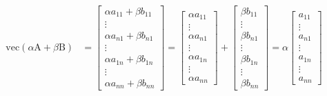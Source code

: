 \documentclass[11pt,a4paper]{article}
\begin{document}
\begin{align*}
\mathrm{vec}(\alpha \mathrm{A} + \beta \mathrm{B})
&=
\begin{bmatrix}
 		\alpha a_{11}+ \beta b_{11}  \\
 		\vdots \\
 		\alpha a_{n1}+ \beta b_{n1} \\
 	\hline	
 		\vdots \\
 	\hline	
 		\alpha a_{1n}+ \beta b_{1n} \\
 		\vdots \\
 		\alpha a_{nn}+ \beta b_{nn}
	\end{bmatrix}	
=
\begin{bmatrix}
 		\alpha a_{11}  \\
 		\vdots \\
 		\alpha a_{n1} \\
 	\hline	
 		\vdots \\
 	\hline	
 		\alpha a_{1n} \\
 		\vdots \\
 		\alpha a_{nn}
\end{bmatrix}	
	+
\begin{bmatrix}
 		\beta b_{11}  \\
 		\vdots \\
 		 \beta b_{n1} \\
 	\hline	
 		\vdots \\
 	\hline	
 		 \beta b_{1n} \\
 		 \vdots \\
 		 \beta b_{nn}
	\end{bmatrix}
=
\alpha 
\begin{bmatrix}
 		a_{11}  \\
 		\vdots \\
 		a_{n1} \\
 	\hline	
 		\vdots \\
 	\hline	
 		a_{1n} \\
 		\vdots \\
 		a_{nn}
\end{bmatrix}	

\end{align*}
\end{document}
